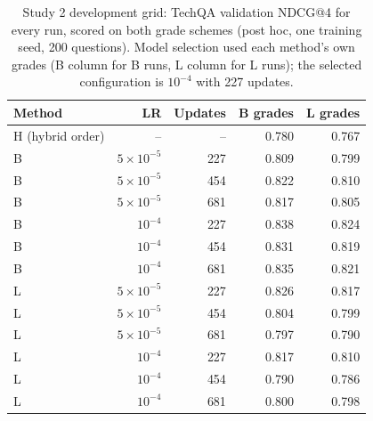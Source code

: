 \begin{table}[htbp]\centering\small
\caption{Study 2 development grid: TechQA validation NDCG@4 for every run, scored on both grade schemes (post hoc, one training seed, 200 questions). Model selection used each method's own grades (B column for B runs, L column for L runs); the selected configuration is $10^{-4}$ with 227 updates.}\label{tab:validationgrid}
\begin{tabular}{lrrrr}\toprule
Method & LR & Updates & B grades & L grades\\\midrule
H (hybrid order) & -- & -- & 0.780 & 0.767\\
B & $5\times10^{-5}$ & 227 & 0.809 & 0.799\\
B & $5\times10^{-5}$ & 454 & 0.822 & 0.810\\
B & $5\times10^{-5}$ & 681 & 0.817 & 0.805\\
B & $10^{-4}$ & 227 & 0.838 & 0.824\\
B & $10^{-4}$ & 454 & 0.831 & 0.819\\
B & $10^{-4}$ & 681 & 0.835 & 0.821\\
L & $5\times10^{-5}$ & 227 & 0.826 & 0.817\\
L & $5\times10^{-5}$ & 454 & 0.804 & 0.799\\
L & $5\times10^{-5}$ & 681 & 0.797 & 0.790\\
L & $10^{-4}$ & 227 & 0.817 & 0.810\\
L & $10^{-4}$ & 454 & 0.790 & 0.786\\
L & $10^{-4}$ & 681 & 0.800 & 0.798\\
\bottomrule\end{tabular}\end{table}
